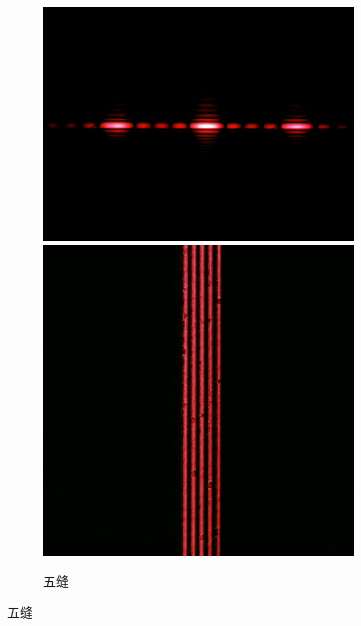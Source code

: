 \documentclass[a4paper]{article}
\begin{document}
\clearpage
\begin{figure}[htbp]\ContinuedFloat
    \centering
    \begin{subfigure}[htbp]{0.3\textwidth}
        \centering
        \includegraphics[width=\textwidth]{fre-done/3-3.JPG}
        \includegraphics[width=\textwidth]{img-done/3-3.JPG}
        \caption{五缝}
        \label{3-3}

\end{subfigure}
\end{figure}
\end{document}
